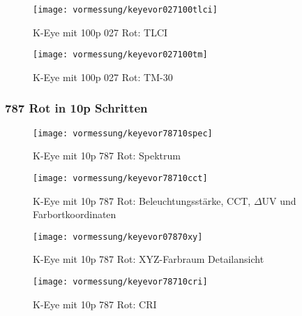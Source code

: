 \documentclass[pagesize,paper=A4,fontsize=12pt,utf8,numbers=noenddot,bibliography=totoc,listof=totoc,DIV=11,BCOR=1mm]{scrreprt}
\begin{document}
\begin{figure}[htp]     %
\centering
\texttt{[image: vormessung/keyevor027100tlci]} 
\caption {K-Eye mit 100p 027 Rot: TLCI} 
\end{figure}

\begin{figure}[htp]     %
\centering
\texttt{[image: vormessung/keyevor027100tm]} 
\caption {K-Eye mit 100p 027 Rot: TM-30} 
\end{figure}


\subsubsection{787 Rot in 10p Schritten}

\begin{figure}[htp]     %
\centering
\texttt{[image: vormessung/keyevor78710spec]} 
\caption {K-Eye mit 10p 787 Rot: Spektrum} 
\end{figure}

\begin{figure}[htp]     %
\centering
\texttt{[image: vormessung/keyevor78710cct]} 
\caption {K-Eye mit 10p 787 Rot: Beleuchtungsstärke, CCT, $\Delta$UV und Farbortkoordinaten} 
\end{figure}

\begin{figure}[htp]     %
\centering
\texttt{[image: vormessung/keyevor07870xy]} 
\caption {K-Eye mit 10p 787 Rot: XYZ-Farbraum Detailansicht} 
\end{figure}

\begin{figure}[htp]     %
\centering
\texttt{[image: vormessung/keyevor78710cri]} 
\caption {K-Eye mit 10p 787 Rot: CRI} 
\end{figure}
\end{document}
